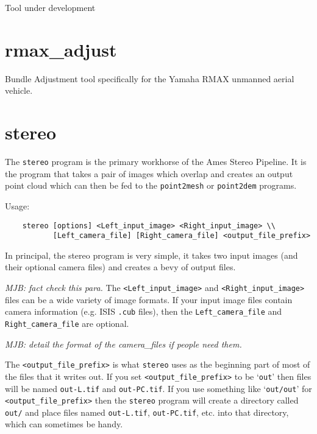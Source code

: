Tool under development

\section{rmax\_adjust}
\label{ramx_adjust}

Bundle Adjustment tool specifically for the Yamaha RMAX unmanned aerial vehicle.

\section{stereo}
\label{stereo}

The \texttt{stereo} program is the primary workhorse of the Ames
Stereo Pipeline.  It is the program that takes a pair of images which
overlap and creates an output point cloud which can then be fed to the
\texttt{point2mesh} or \texttt{point2dem} programs.

\medskip

Usage:
\begin{verbatim}
    stereo [options] <Left_input_image> <Right_input_image> \\
           [Left_camera_file] [Right_camera_file] <output_file_prefix>
\end{verbatim}

\medskip

In principal, the stereo program is very simple, it takes two input
images (and their optional camera files) and creates a bevy of
output files.

\emph{MJB: fact check this para.}
The \verb=<Left_input_image>= and \verb=<Right_input_image>= files can be a wide variety of image formats.  If your input image files contain camera information (e.g. ISIS \verb=.cub= files), then the \verb=Left_camera_file= and \verb=Right_camera_file= are optional.

\emph{MJB: detail the format of the camera\_files if people need them.}

The \verb=<output_file_prefix>= is what \verb=stereo= uses as the
beginning part of most of the files that it writes out.  If you set
\verb=<output_file_prefix>= to be `\verb=out=' then files will be
named \verb=out-L.tif= and  \verb=out-PC.tif=.  If you use something
like `\verb=out/out=' for \verb=<output_file_prefix>= then the
\verb=stereo= program will create a directory called \verb=out/= and
place files named \verb=out-L.tif=, \verb=out-PC.tif=, etc. into
that directory, which can sometimes be handy.

